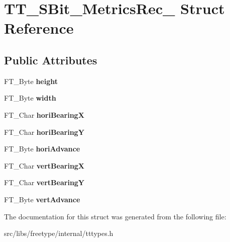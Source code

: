 \hypertarget{struct_t_t___s_bit___metrics_rec__}{
\section{TT\_\-SBit\_\-MetricsRec\_\- Struct Reference}
\label{struct_t_t___s_bit___metrics_rec__}
}
\subsection*{Public Attributes}
\begin{DoxyCompactItemize}
\item 
\hypertarget{struct_t_t___s_bit___metrics_rec___a79b25794122888101aae80c7b74fc1fc}{
FT\_\-Byte {\bfseries height}}
\label{struct_t_t___s_bit___metrics_rec___a79b25794122888101aae80c7b74fc1fc}

\item 
\hypertarget{struct_t_t___s_bit___metrics_rec___a3444618e2c2a612a662a5e0d2c3f25ef}{
FT\_\-Byte {\bfseries width}}
\label{struct_t_t___s_bit___metrics_rec___a3444618e2c2a612a662a5e0d2c3f25ef}

\item 
\hypertarget{struct_t_t___s_bit___metrics_rec___a786ba1081993e18d514ddf37c2662c7b}{
FT\_\-Char {\bfseries horiBearingX}}
\label{struct_t_t___s_bit___metrics_rec___a786ba1081993e18d514ddf37c2662c7b}

\item 
\hypertarget{struct_t_t___s_bit___metrics_rec___aaed1567b444a1bee4b3478b2cdb9259f}{
FT\_\-Char {\bfseries horiBearingY}}
\label{struct_t_t___s_bit___metrics_rec___aaed1567b444a1bee4b3478b2cdb9259f}

\item 
\hypertarget{struct_t_t___s_bit___metrics_rec___a8b0c5271aaf220f7a8cbf4838854e220}{
FT\_\-Byte {\bfseries horiAdvance}}
\label{struct_t_t___s_bit___metrics_rec___a8b0c5271aaf220f7a8cbf4838854e220}

\item 
\hypertarget{struct_t_t___s_bit___metrics_rec___a626e67e02494faab653a7543bb0b7c79}{
FT\_\-Char {\bfseries vertBearingX}}
\label{struct_t_t___s_bit___metrics_rec___a626e67e02494faab653a7543bb0b7c79}

\item 
\hypertarget{struct_t_t___s_bit___metrics_rec___aef4755ed22ba72e5fa304920bae03146}{
FT\_\-Char {\bfseries vertBearingY}}
\label{struct_t_t___s_bit___metrics_rec___aef4755ed22ba72e5fa304920bae03146}

\item 
\hypertarget{struct_t_t___s_bit___metrics_rec___a947468e42759089d0b5c5fa10a0defdf}{
FT\_\-Byte {\bfseries vertAdvance}}
\label{struct_t_t___s_bit___metrics_rec___a947468e42759089d0b5c5fa10a0defdf}

\end{DoxyCompactItemize}


The documentation for this struct was generated from the following file:\begin{DoxyCompactItemize}
\item 
src/libs/freetype/internal/tttypes.h\end{DoxyCompactItemize}
